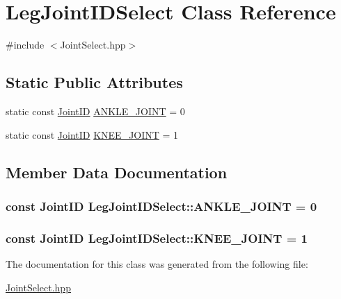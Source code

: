 \hypertarget{classLegJointIDSelect}{}\section{Leg\+Joint\+I\+D\+Select Class Reference}
\label{classLegJointIDSelect}


{\ttfamily \#include $<$Joint\+Select.\+hpp$>$}

\subsection*{Static Public Attributes}
\begin{DoxyCompactItemize}
\item 
static const \hyperlink{JointSelect_8hpp_a4afd2607cffce38f5ade02dfdc389cc3}{Joint\+ID} \hyperlink{classLegJointIDSelect_a7d0193d9041588926230f7df2da03a31}{A\+N\+K\+L\+E\+\_\+\+J\+O\+I\+NT} = 0
\item 
static const \hyperlink{JointSelect_8hpp_a4afd2607cffce38f5ade02dfdc389cc3}{Joint\+ID} \hyperlink{classLegJointIDSelect_a9418758868d891b3b5b4d88295bdf124}{K\+N\+E\+E\+\_\+\+J\+O\+I\+NT} = 1
\end{DoxyCompactItemize}


\subsection{Member Data Documentation}
\subsubsection[{\texorpdfstring{A\+N\+K\+L\+E\+\_\+\+J\+O\+I\+NT}{ANKLE_JOINT}}]{\setlength{\rightskip}{0pt plus 5cm}const {\bf Joint\+ID} Leg\+Joint\+I\+D\+Select\+::\+A\+N\+K\+L\+E\+\_\+\+J\+O\+I\+NT = 0\hspace{0.3cm}{\ttfamily [static]}}\hypertarget{classLegJointIDSelect_a7d0193d9041588926230f7df2da03a31}{}\label{classLegJointIDSelect_a7d0193d9041588926230f7df2da03a31}
\subsubsection[{\texorpdfstring{K\+N\+E\+E\+\_\+\+J\+O\+I\+NT}{KNEE_JOINT}}]{\setlength{\rightskip}{0pt plus 5cm}const {\bf Joint\+ID} Leg\+Joint\+I\+D\+Select\+::\+K\+N\+E\+E\+\_\+\+J\+O\+I\+NT = 1\hspace{0.3cm}{\ttfamily [static]}}\hypertarget{classLegJointIDSelect_a9418758868d891b3b5b4d88295bdf124}{}\label{classLegJointIDSelect_a9418758868d891b3b5b4d88295bdf124}


The documentation for this class was generated from the following file\+:\begin{DoxyCompactItemize}
\item 
\hyperlink{JointSelect_8hpp}{Joint\+Select.\+hpp}\end{DoxyCompactItemize}
